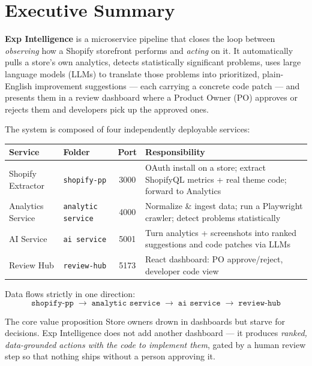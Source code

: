 \documentclass[11pt,a4paper]{article}
\begin{document}
\section{Executive Summary}

\textbf{Exp Intelligence} is a microservice pipeline that closes the loop
between \emph{observing} how a Shopify storefront performs and \emph{acting}
on it. It automatically pulls a store's own analytics, detects statistically
significant problems, uses large language models (LLMs) to translate those
problems into prioritized, plain-English improvement suggestions --- each
carrying a concrete code patch --- and presents them in a review dashboard
where a Product Owner (PO) approves or rejects them and developers pick up the
approved ones.

The system is composed of four independently deployable services:

\begin{center}
\begin{tabularx}{\textwidth}{@{}l l c Y@{}}
\toprule
\textbf{Service} & \textbf{Folder} & \textbf{Port} & \textbf{Responsibility}\\
\midrule
Shopify Extractor & \texttt{shopify-pp} & 3000 & OAuth install on a store; extract ShopifyQL metrics + real theme code; forward to Analytics\\
Analytics Service & \texttt{analytic service} & 4000 & Normalize \& ingest data; run a Playwright crawler; detect problems statistically\\
AI Service & \texttt{ai service} & 5001 & Turn analytics + screenshots into ranked suggestions and code patches via LLMs\\
Review Hub & \texttt{review-hub} & 5173 & React dashboard: PO approve/reject, developer code view\\
\bottomrule
\end{tabularx}
\end{center}

Data flows strictly in one direction:
\[
\texttt{shopify-pp}\;\rightarrow\;\texttt{analytic service}\;\rightarrow\;\texttt{ai service}\;\rightarrow\;\texttt{review-hub}
\]

\begin{keybox}{The core value proposition}
Store owners drown in dashboards but starve for decisions. Exp Intelligence
does not add another dashboard --- it produces \emph{ranked, data-grounded
actions with the code to implement them}, gated by a human review step so that
nothing ships without a person approving it.
\end{keybox}
\end{document}
